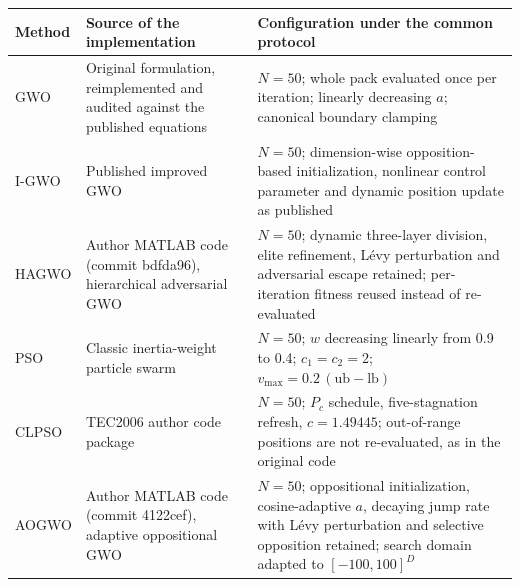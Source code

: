 \begin{tabular}{p{1.7cm}p{5.4cm}p{7.9cm}}
\toprule
Method & Source of the implementation & Configuration under the common protocol \\
\midrule
GWO & Original formulation, reimplemented and audited against the published equations \citep{mirjalili2014gwo} & $N=50$; whole pack evaluated once per iteration; linearly decreasing $a$; canonical boundary clamping \\
I-GWO & Published improved GWO \citep{nadimi2021igwo} & $N=50$; dimension-wise opposition-based initialization, nonlinear control parameter and dynamic position update as published \\
HAGWO & Author MATLAB code (commit bdfda96), hierarchical adversarial GWO \citep{su2026hagwo} & $N=50$; dynamic three-layer division, elite refinement, L\'evy perturbation and adversarial escape retained; per-iteration fitness reused instead of re-evaluated \\
PSO & Classic inertia-weight particle swarm \citep{kennedy1995pso,shi1998modified} & $N=50$; $w$ decreasing linearly from 0.9 to 0.4; $c_1=c_2=2$; $v_{\max}=0.2\,(\mathrm{ub}-\mathrm{lb})$ \\
CLPSO & TEC2006 author code package \citep{liang2006clpso} & $N=50$; $P_c$ schedule, five-stagnation refresh, $c=1.49445$; out-of-range positions are not re-evaluated, as in the original code \\
AOGWO & Author MATLAB code (commit 4122cef), adaptive oppositional GWO \citep{khalid2026aogwo} & $N=50$; oppositional initialization, cosine-adaptive $a$, decaying jump rate with L\'evy perturbation and selective opposition retained; search domain adapted to $[-100,100]^D$ \\
\bottomrule
\end{tabular}
